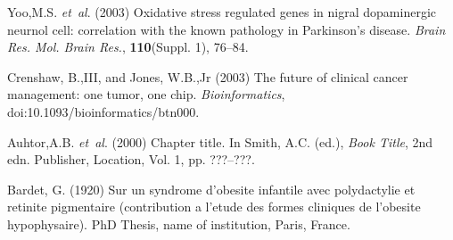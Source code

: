 \documentclass{bioinfo}
\begin{document}
\begin{thebibliography}{}
Yoo,M.S. \textit{et~al}. (2003) Oxidative stress regulated genes
in nigral dopaminergic neurnol cell: correlation with the known
pathology in Parkinson's disease. \textit{Brain Res. Mol. Brain
Res.}, \textbf{110}(Suppl. 1), 76--84.

Crenshaw, B.,III, and Jones, W.B.,Jr (2003) The future of clinical
cancer management: one tumor, one chip. \textit{Bioinformatics},
doi:10.1093/bioinformatics/btn000.

Auhtor,A.B. \textit{et~al}. (2000) Chapter title. In Smith, A.C.
(ed.), \textit{Book Title}, 2nd edn. Publisher, Location, Vol. 1, pp.
???--???.

Bardet, G. (1920) Sur un syndrome d'obesite infantile avec
polydactylie et retinite pigmentaire (contribution a l'etude des
formes cliniques de l'obesite hypophysaire). PhD Thesis, name of
institution, Paris, France.

\end{thebibliography}
\end{document}
